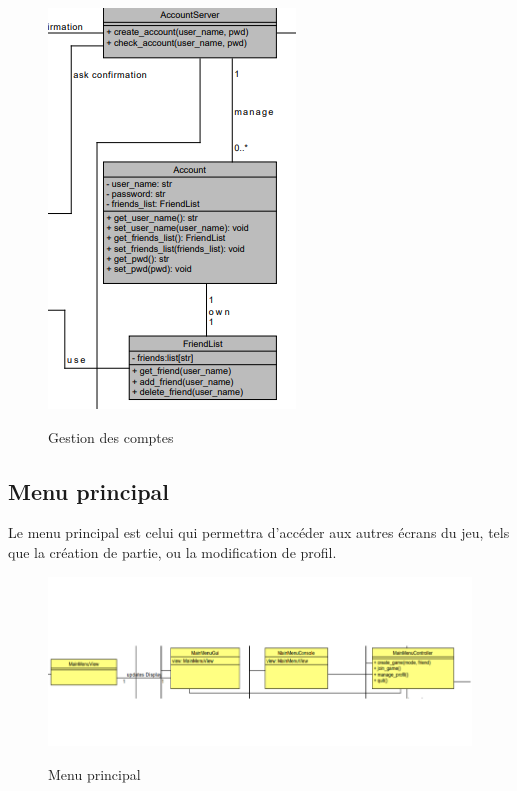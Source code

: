 \documentclass[../design_fonctionnement_sys.tex]{subfiles}
\begin{document}
\begin{figure}[H]
    \centering
    \includegraphics[scale=0.6]{img_design/Gestion_de_comptes.png}
    \label{fig:seq_match_server}
    \caption{Gestion des comptes}
\end{figure}


\subsection{Menu principal}
Le menu principal est celui qui permettra d'accéder aux autres écrans du jeu, tels que la création de partie, ou la modification de profil.
\begin{figure}[H]
    \centering
    \includegraphics[scale=0.6]{img_design/Main_menu.png}
    \label{fig:seq_match_server}
    \caption{Menu principal}
\end{figure}
\end{document}
